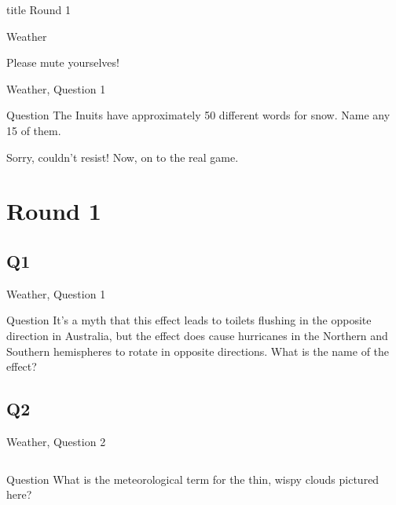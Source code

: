 \documentclass[11pt]{beamer}
\begin{document}
\begin{frame}
\vfill
\centering
\begin{beamercolorbox}[sep=8pt,center,shadow=true,rounded=true]{title}
Round 1\par%
Weather\par%
\end{beamercolorbox}
\begin{center}
Please mute yourselves!
\end{center}
\vfill
\end{frame}

\begin{frame}[t]{Weather, Question 1}

\begin{block}{Question}
The Inuits have approximately 50 different words for snow. Name any 15 of them.
\end{block}
\pause{}
\begin{block}{}
Sorry, couldn't resist! Now, on to the real game.
\end{block}
\end{frame}
\def\thisSectionName{Weather}
\section{Round 1}
\subsection*{Q1}
\begin{frame}[t]{Weather, Question 1}
\begin{block}{Question}
It's a myth that this effect leads to toilets flushing in the opposite direction in Australia, but the effect does cause hurricanes in the Northern and Southern hemispheres to rotate in opposite directions. What is the name of the effect?
\end{block}
\end{frame}
\subsection*{Q2}
\begin{frame}[t]{Weather, Question 2}
\begin{columns}[T,totalwidth=\linewidth]
\begin{column}{0.32\linewidth}
\begin{block}{Question}
What is the meteorological term for the thin, wispy clouds pictured here?
\end{block}
\end{column}
\begin{column}{0.65\linewidth}
\begin{center}
\texttt{[image: \{Images/cirrus]}.jpg}
\end{center}
\end{column}
\end{columns}
\end{frame}
\end{document}
